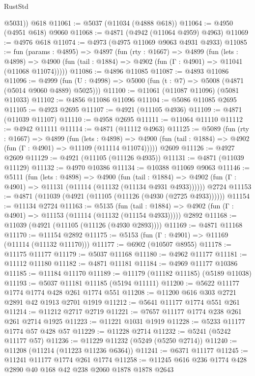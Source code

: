 \begin{lexlean}{RustStd}
\begin{coremodule}
        @5031))
    @618
@11061 := @5037 (@11034 (@4888 @618))
@11064 := @4950 (@4951 @618) @9060
@11068 := @4871 (@4942 (@11064 @4959) @4963)
@11069 := @4976 @618
@11074 := @4973 (@4975 @11069 @9063 @4931 @4933)
@11085 := fun (params : @4895) =>
  @4897
    (fun (rty : @1667) =>
    @4899
      (fun (lets : @4898) =>
      @4900 (fun (tail : @1884) => @4902 (fun (Γ : @4901) => @11041 (@11068 @11074)))))
@11086 := @4896 @11085
@11087 := @4893 @11086
@11096 := @4999 (fun (U : @4998) => @5000 (fun (t : @7) => @5008 (@4871 (@5014 @9060 @4889) @5025)))
@11100 := @11061 (@11087 @11096) (@5081 @11033)
@11102 := @4856 @11086 @11096
@11104 := @5086 @11085 @2695
@11105 := @4923 @2695
@11107 := @4921 (@11105 @4936)
@11109 := @4871 (@11039 @11107)
@11110 := @4958 @2695
@11111 := @11064 @11110
@11112 := @4942 @11111
@11114 := @4871 (@11112 @4963)
@11125 := @5089
    (fun (rty : @1667) =>
    @4899
      (fun (lets : @4898) =>
      @4900 (fun (tail : @1884) => @4902 (fun (Γ : @4901) => @11109 (@11114 @11074)))))
    @2609
@11126 := @4927 @2609
@11129 := @4921 (@11105 (@11126 @4935))
@11131 := @4871 (@11039 @11129)
@11132 := @4970 @10386
@11134 := @10388 @11069 @9063
@11146 := @5111
    (fun (lets : @4898) =>
    @4900
      (fun (tail : @1884) =>
      @4902 (fun (Γ : @4901) => @11131 (@11114 (@11132 (@11134 @4931 @4933))))))
    @2724
@11153 := @4871 (@11039 (@4921 (@11105 (@11126 (@4930 (@2725 @4933))))))
@11154 := @11134 @2724
@11163 := @5135
    (fun (tail : @1884) => @4902 (fun (Γ : @4901) => @11153 (@11114 (@11132 (@11154 @4933)))))
    @2892
@11168 := @11039 (@4921 (@11105 (@11126 (@4930 @2893))))
@11169 := @4871 @11168
@11170 := @11154 @2892
@11175 := @5153 (fun (Γ : @4901) => @11169 (@11114 (@11132 @11170)))
@11177 := @6902 (@10507 @8955)
@11178 := @11175 @11177
@11179 := @5037 @11168
@11180 := @4962 @11177
@11181 := @11112 @11180
@11182 := @4871 @11181
@11184 := @4969 @11177 @10386
@11185 := @11184 @11170
@11189 := @11179 (@11182 @11185) (@5189 @11038)
@11193 := @5037 @11181 @11185 (@5194 @11111)
@11200 := @5622 @11177 @1774 @1774 @428 @261 @1774 @551
@11208 := @11200 @616 @303 @2721 @2891 @42 @1913 @2701 @1919
@11212 := @5641 @11177 @1774 @551 @261
@11214 := @11212 @2717 @2719
@11221 := @7657 @11177 @1774 @238 @261 @261 @2714 @1925
@11223 := @11221 @1031 @1919
@11228 := @5233 @11177 @1774 @57 @428 @57
@11229 := @11228 @2714
@11232 := @5241 (@5242 @11177 @57)
@11236 := @11229 @11232 (@5249 (@5250 @2714))
@11240 := @11208 (@11214 (@11223 @11236 @6364))
@11241 := @6371 @11177
@11245 := @11241 @11177 @1774 @261 @1774
@11258 := @11245 @616 @236 @1774 @428 @2890 @40 @168 @42 @238 @2060 @1878 @1878 @2643

\end{coremodule}
\end{lexlean}
